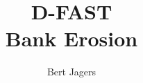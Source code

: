 \documentclass{deltares_manual_dfastbe}
\begin{document}
\title{D-FAST\\ Bank Erosion}
\subtitle{}

\author{Bert Jagers}

\deltarestitle
%







%

\appendix


\end{document}

